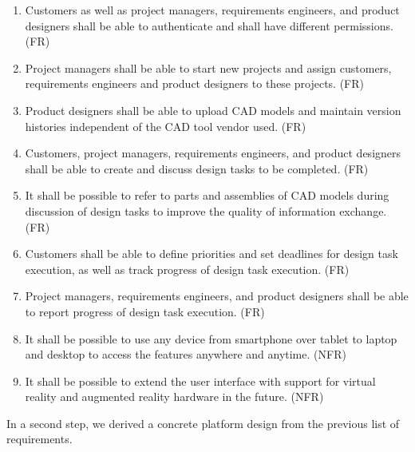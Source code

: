\begin{enumerate}
    \item Customers as well as project managers, requirements engineers, and product designers shall be able to authenticate and shall have different permissions. (FR)
    \item Project managers shall be able to start new projects and assign customers, requirements engineers and product designers to these projects. (FR)
    \item Product designers shall be able to upload CAD models and maintain version histories independent of the CAD tool vendor used. (FR)
    \item Customers, project managers, requirements engineers, and product designers shall be able to create and discuss design tasks to be completed. (FR)
    \item It shall be possible to refer to parts and assemblies of CAD models during discussion of design tasks to improve the quality of information exchange. (FR)
    \item Customers shall be able to define priorities and set deadlines for design task execution, as well as track progress of design task execution. (FR)
    \item Project managers, requirements engineers, and product designers shall be able to report progress of design task execution. (FR)
    \item It shall be possible to use any device from smartphone over tablet to laptop and desktop to access the features anywhere and anytime. (NFR)
    \item It shall be possible to extend the user interface with support for virtual reality and augmented reality hardware in the future. (NFR)
\end{enumerate}

In a second step, we derived a concrete platform design from the previous list of requirements.
